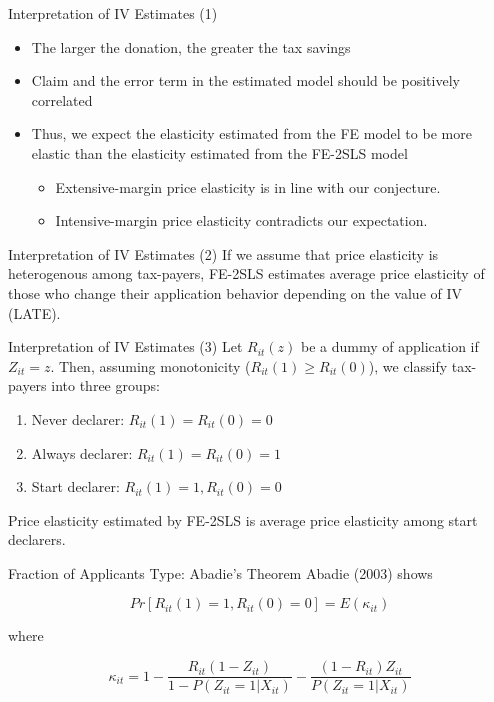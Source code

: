 \documentclass[
  ignorenonframetext,
  aspectratio=169,
]{beamer}
\providecommand{\tightlist}{%
  \setlength{\itemsep}{0pt}\setlength{\parskip}{0pt}}
\begin{document}
\begin{frame}{Interpretation of IV Estimates (1)}
\protect\hypertarget{interpretation-of-iv-estimates-1}{}
\begin{itemize}
\tightlist
\item
  The larger the donation, the greater the tax savings
\item
  Claim and the error term in the estimated model
  should be positively correlated
\item
  Thus, we expect the elasticity estimated from the FE model
  to be more elastic than the elasticity estimated from the FE-2SLS model

  \begin{itemize}
  \tightlist
  \item
    Extensive-margin price elasticity is in line with our conjecture.
  \item
    Intensive-margin price elasticity contradicts our expectation.
  \end{itemize}
\end{itemize}
\end{frame}

\begin{frame}{Interpretation of IV Estimates (2)}
\protect\hypertarget{interpretation-of-iv-estimates-2}{}
If we assume that price elasticity is heterogenous among tax-payers,
FE-2SLS estimates average price elasticity of
those who change their application behavior
depending on the value of IV (LATE).
\end{frame}

\begin{frame}{Interpretation of IV Estimates (3)}
\protect\hypertarget{interpretation-of-iv-estimates-3}{}
Let \(R_{it}(z)\) be a dummy of application if \(Z_{it} = z\).
Then, assuming monotonicity (\(R_{it}(1) \ge R_{it}(0)\)),
we classify tax-payers into three groups:

\begin{enumerate}
\tightlist
\item
  Never declarer: \(R_{it}(1) = R_{it}(0) = 0\)
\item
  Always declarer: \(R_{it}(1) = R_{it}(0) = 1\)
\item
  Start declarer: \(R_{it}(1) =1, R_{it}(0) = 0\)
\end{enumerate}

Price elasticity estimated by FE-2SLS is
average price elasticity among start declarers.
\end{frame}

\begin{frame}{Fraction of Applicants Type: Abadie's Theorem}
\protect\hypertarget{fraction-of-applicants-type-abadies-theorem}{}
Abadie (2003) shows

\[ Pr[R_{it}(1) =1, R_{it}(0) = 0] = E(\kappa_{it}) \]

where

\[
\kappa_{it} = 1
- \frac{R_{it}(1 - Z_{it})}{1 - P(Z_{it} = 1|X_{it})}
- \frac{(1 - R_{it})Z_{it}}{P(Z_{it} = 1|X_{it})}
\]
\end{frame}
\end{document}
